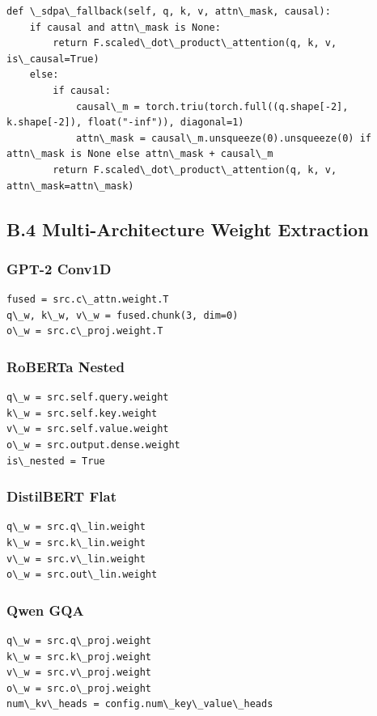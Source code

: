 \begin{lstlisting}
def \_sdpa\_fallback(self, q, k, v, attn\_mask, causal):
    if causal and attn\_mask is None:
        return F.scaled\_dot\_product\_attention(q, k, v, is\_causal=True)
    else:
        if causal:
            causal\_m = torch.triu(torch.full((q.shape[-2], k.shape[-2]), float("-inf")), diagonal=1)
            attn\_mask = causal\_m.unsqueeze(0).unsqueeze(0) if attn\_mask is None else attn\_mask + causal\_m
        return F.scaled\_dot\_product\_attention(q, k, v, attn\_mask=attn\_mask)
\end{lstlisting}

\subsection{B.4 Multi-Architecture Weight Extraction}

\subsubsection{GPT-2 Conv1D}
\begin{lstlisting}
fused = src.c\_attn.weight.T
q\_w, k\_w, v\_w = fused.chunk(3, dim=0)
o\_w = src.c\_proj.weight.T
\end{lstlisting}

\subsubsection{RoBERTa Nested}
\begin{lstlisting}
q\_w = src.self.query.weight
k\_w = src.self.key.weight
v\_w = src.self.value.weight
o\_w = src.output.dense.weight
is\_nested = True
\end{lstlisting}

\subsubsection{DistilBERT Flat}
\begin{lstlisting}
q\_w = src.q\_lin.weight
k\_w = src.k\_lin.weight
v\_w = src.v\_lin.weight
o\_w = src.out\_lin.weight
\end{lstlisting}

\subsubsection{Qwen GQA}
\begin{lstlisting}
q\_w = src.q\_proj.weight
k\_w = src.k\_proj.weight
v\_w = src.v\_proj.weight
o\_w = src.o\_proj.weight
num\_kv\_heads = config.num\_key\_value\_heads
\end{lstlisting}

